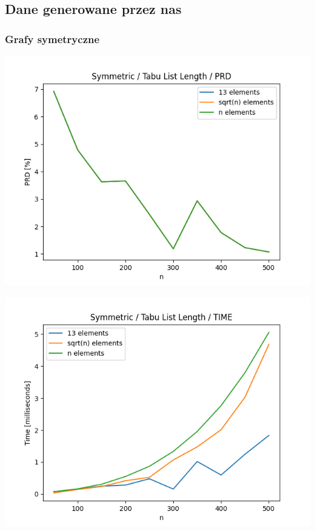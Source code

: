 \documentclass{article}
\begin{document}
\subsection{Dane generowane przez nas}


\subsubsection{Grafy symetryczne}

\begin{center}
\includegraphics[width=\textwidth, 
                   height = 0.4\textheight, 
                   keepaspectratio]
                  {plots/tabu_symmetric_prd} 
\end{center}

\begin{center}
\includegraphics[width=\textwidth, 
                   height = 0.4\textheight, 
                   keepaspectratio]
                  {plots/tabu_symmetric_time} 
\end{center}
\end{document}
